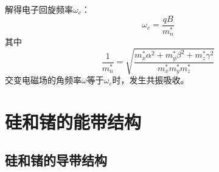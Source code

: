 解得电子回旋频率$\omega_c$：
\begin{equation}
    \omega_c=\frac{qB}{m_n^*}
\end{equation}
其中
\begin{equation}
    \frac{1}{m_n^*}=\sqrt{\frac{m_x^*\alpha^2+m_y^*\beta^2+m_z^*\gamma^2}{m_x^*m_y^*m_z^*}}\label{eq:ecllipse-cyclotron-resonance-eff-mass}
\end{equation}
交变电磁场的角频率$\omega$等于$\omega_c$时，发生共振吸收。

\section{硅和锗的能带结构}

\subsection{硅和锗的导带结构}

